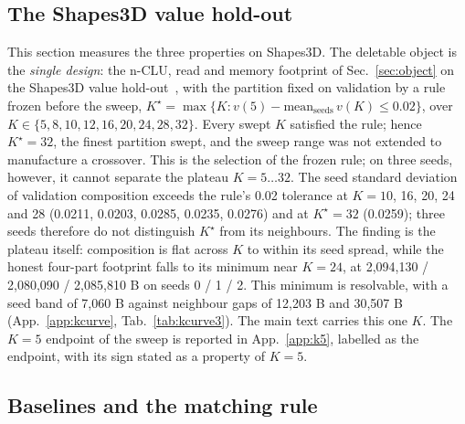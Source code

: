 \documentclass{article} %
\newcommand{\Kstar}{\ensuremath{K^{\star}}}
\begin{document}
\subsection{The Shapes3D value hold-out}
\label{sec:shapes}

This section measures the three properties on Shapes3D. The deletable object is the \emph{single design}: the n-CLU, read and memory footprint of
Sec.~\ref{sec:object} on the Shapes3D value hold-out~\citep{montero2021role,schott_visual_2022}, with the partition fixed on validation
by a rule frozen before the sweep, $\Kstar=\max\{K : v(5)-\text{mean}_{\text{seeds}}\,v(K)\le
0.02\}$, over $K\in\{5,8,10,12,16,20,24,28,32\}$. Every swept $K$ satisfied the rule; hence
$\Kstar=32$, the finest partition swept, and the sweep range was not extended to manufacture a
crossover. %
This is the selection of the frozen rule; on three seeds, however, it cannot separate the plateau
$K=5\ldots32$. The seed standard deviation of validation composition exceeds the rule's 0.02
tolerance at $K=10$, 16, 20, 24 and 28 (0.0211, 0.0203, 0.0285, 0.0235, 0.0276) and at $\Kstar=32$ %
(0.0259); three seeds therefore do not distinguish $\Kstar$ from its neighbours. %
The finding is the plateau itself: composition is flat across $K$ to within its seed spread,
while the honest four-part footprint falls to its minimum near $K=24$, at 2,094,130 / 2,080,090 / 2,085,810 B %
on seeds 0 / 1 / 2. This minimum is resolvable, with a seed band of 7,060 B against neighbour gaps of %
12,203 B and 30,507 B (App.~\ref{app:kcurve}, Tab.~\ref{tab:kcurve3}). %
The main text carries this one $K$. The $K=5$ endpoint of the sweep is reported in
App.~\ref{app:k5}, labelled as the endpoint, with its sign stated as a property of $K=5$.

\subsection{Baselines and the matching rule}
\end{document}

